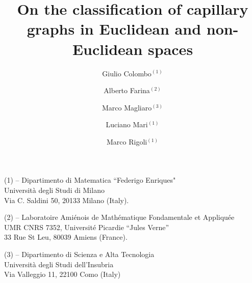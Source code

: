 \documentclass[10 pt,a4paper]{article}
\theoremstyle{definition}
\begin{document}

\newcommand{\rk}{\mathrm{rk}}


\newcommand{\crit}{\mathrm{crit}}

\newcommand{\diam}{\mathrm{diam}}

\newcommand{\haus}{\mathscr{H}}

\newcommand{\po}{\mathrm{po}}

\newcommand{\gr}{\mathcal{G}}

\newcommand{\sn}{\mathrm{sn}_H}

\newcommand{\cn}{\mathrm{cn}_H}

\newcommand{\Tr}{\mathrm{Tr}}

\newcommand{\bh}{\mathbb{B}}
\newcommand{\Gr}{\mathrm{Gr}}
\newcommand{\Pa}{\mathcal{P}}

\newcommand{\aaa}{a(|\nabla u|)}
\newcommand{\aap}{a'(|\nabla u|)}
\newcommand{\inte}{\mathrm{Int}}

\newcommand{\tcr}{\textcolor{red}}
\newcommand{\tcb}{\textcolor{blue}}
\newcommand{\tco}{\textcolor{red}}
\newcommand{\critu}{{\rm crit}(u)}













\author{Giulio Colombo${}^{(1)}$ 
	\and 
	Alberto Farina${}^{(2)}$
\and Marco Magliaro${}^{(3)}$
\and Luciano Mari${}^{(1)}$
\and Marco Rigoli${}^{(1)}$ 
}
\title{\textbf{On the classification of capillary graphs in Euclidean and non-Euclidean spaces}}
\date{}
\maketitle
\scriptsize \begin{center} (1) -- Dipartimento di Matematica ``Federigo Enriques"\\
Universit\`a degli Studi di Milano\\ 
Via C. Saldini 50, 20133 Milano (Italy).
\end{center}    
\scriptsize \begin{center} (2) -- Laboratoire 
Ami\'enois de Math\'ematique Fondamentale et Appliqu\'ee\\
UMR CNRS 7352, Universit\'e Picardie ``Jules Verne'' \\33 Rue St Leu, 80039 Amiens (France).\\ 
\end{center}
\scriptsize \begin{center} (3) -- Dipartimento di Scienza e Alta Tecnologia\\
Universit\`a degli Studi dell'Insubria\\
Via Valleggio 11, 22100 Como (Italy)
\end{center}    
\end{document}
